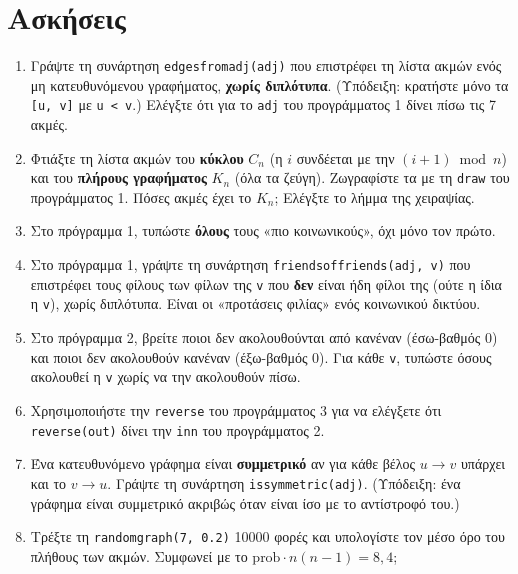\documentclass[11pt,a4paper]{article}
\newcommand{\code}[1]{\texttt{#1}}
\renewcommand{\_}{\textunderscore\allowbreak}
\begin{document}
\section{Ασκήσεις}

\begin{enumerate}
  \item Γράψτε τη συνάρτηση \code{edges\_from\_adj(adj)} που επιστρέφει τη λίστα ακμών ενός μη
        κατευθυνόμενου γραφήματος, \textbf{χωρίς διπλότυπα}. (Υπόδειξη: κρατήστε μόνο τα
        \code{[u, v]} με \code{u < v}.) Ελέγξτε ότι για το \code{adj} του προγράμματος 1 δίνει
        πίσω τις 7 ακμές.
  \item Φτιάξτε τη λίστα ακμών του \textbf{κύκλου} $C_n$ (η $i$ συνδέεται με την $(i+1) \bmod n$)
        και του \textbf{πλήρους γραφήματος} $K_n$ (όλα τα ζεύγη). Ζωγραφίστε τα με τη \code{draw} του
        προγράμματος 1. Πόσες ακμές έχει το $K_n$; Ελέγξτε το λήμμα της χειραψίας.
  \item Στο πρόγραμμα 1, τυπώστε \textbf{όλους} τους «πιο κοινωνικούς», όχι μόνο τον πρώτο.
  \item Στο πρόγραμμα 1, γράψτε τη συνάρτηση \code{friends\_of\_friends(adj, v)} που επιστρέφει τους
        φίλους των φίλων της \code{v} που \textbf{δεν} είναι ήδη φίλοι της (ούτε η ίδια η \code{v}),
        χωρίς διπλότυπα. Είναι οι «προτάσεις φιλίας» ενός κοινωνικού δικτύου.
  \item Στο πρόγραμμα 2, βρείτε ποιοι δεν ακολουθούνται από κανέναν (έσω-βαθμός 0) και ποιοι δεν
        ακολουθούν κανέναν (έξω-βαθμός 0). Για κάθε \code{v}, τυπώστε όσους ακολουθεί η \code{v}
        χωρίς να την ακολουθούν πίσω.
  \item Χρησιμοποιήστε την \code{reverse} του προγράμματος 3 για να ελέγξετε ότι
        \code{reverse(out)} δίνει την \code{inn} του προγράμματος 2.
  \item Ένα κατευθυνόμενο γράφημα είναι \textbf{συμμετρικό} αν για κάθε βέλος $u \to v$ υπάρχει και
        το $v \to u$. Γράψτε τη συνάρτηση \code{is\_symmetric(adj)}. (Υπόδειξη: ένα γράφημα είναι
        συμμετρικό ακριβώς όταν είναι ίσο με το αντίστροφό του.)
  \item Τρέξτε τη \code{random\_graph(7, 0.2)} 10000 φορές και υπολογίστε τον μέσο όρο του πλήθους
        των ακμών. Συμφωνεί με το $\text{prob} \cdot n(n-1) = 8{,}4$;
\end{enumerate}

\newpage
\appendix
{}
\end{document}
